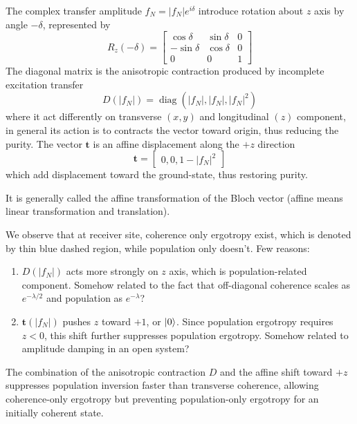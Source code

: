 \documentclass[../../../main.tex]{subfiles}
\begin{document}
The complex transfer amplitude $f_N = |f_N|e^{i\delta}$ introduce rotation about $z$ axis by angle $-\delta$, represented by
\begin{equation*}
  R_z (-\delta) =
  \begin{bmatrix}
    \cos\delta  & \sin\delta & 0 \\
    -\sin\delta & \cos\delta & 0 \\
    0           & 0          & 1
  \end{bmatrix}
\end{equation*}
The diagonal matrix is the anisotropic contraction produced by incomplete excitation transfer
\begin{equation*}
  D(|f_N|) = \operatorname{diag}(|f_N|,|f_N|,|f_N|^2)
\end{equation*}
where it act differently on transverse $(x,y)$ and longitudinal $(z)$ component, in general its action is to contracts the vector toward origin, thus reducing the purity.
The vector $\textbf{t}$ is an affine displacement along the \(+z\) direction
\begin{equation*}
  \textbf{t} = \begin{bmatrix} 0, 0,1-|f_N|^2 \end{bmatrix}
\end{equation*}
which add displacement toward the ground-state, thus restoring purity.

It is generally called the affine transformation of the Bloch vector (affine means linear transformation and translation).

We observe that at receiver site, coherence only ergotropy exist, which is denoted by thin blue dashed region, while population only doesn't.
Few reasons:
\begin{enumerate}
  \item $D(|f_N|)$ acts more strongly on $z$ axis, which is population-related component.
        Somehow related to the fact that off-diagonal coherence scales as $e^{-\lambda/2}$ and population as $e^{-\lambda}$?
  \item $\mathbf{t}(|f_N|)$ pushes \(z\) toward \(+1\), or $\ket{0}$.
        Since population ergotropy requires \(z<0\), this shift further suppresses population ergotropy.
        Somehow related to amplitude damping in an open system?
\end{enumerate}
The combination of the anisotropic contraction $D$ and the affine shift toward \(+z\) suppresses population inversion faster than transverse coherence, allowing coherence-only ergotropy but preventing population-only ergotropy for an initially coherent state.
\end{document}
